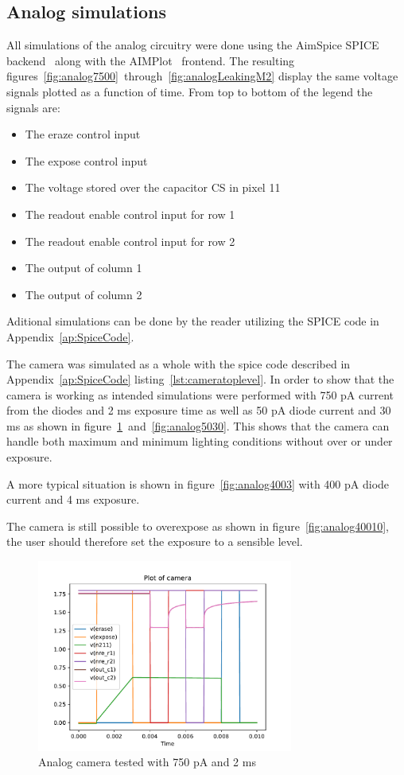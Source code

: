 \subsection{Analog simulations} \label{sec:analogSimulations}

All simulations of the analog circuitry were done using the AimSpice SPICE backend~\cite{AIMSpice} along with the AIMPlot~\cite{aimplot} frontend.
The resulting figures~\ref{fig:analog7500}~through~\ref{fig:analogLeakingM2} display the same voltage signals plotted as a function of time.
From top to bottom of the legend the signals are:
\begin{itemize}
\item The eraze control input
\item The expose control input
\item The voltage stored over the capacitor CS in pixel 11
\item The readout enable control input for row 1
\item The readout enable control input for row 2
\item The output of column 1
\item The output of column 2
\end{itemize}

Aditional simulations can be done by the reader utilizing the SPICE code in Appendix~\ref{ap:SpiceCode}.

The camera was simulated as a whole with the spice code described in Appendix~\ref{ap:SpiceCode} listing~\ref{lst:cameratoplevel}.
In order to show that the camera is working as intended simulations were performed with 750 pA current from the diodes and 2 ms exposure time as well as 50 pA diode current and 30 ms as shown in figure~\ref{fig:analog7502}~and~\ref{fig:analog5030}.
This shows that the camera can handle both maximum and minimum lighting conditions without over or under exposure.

A more typical situation is shown in figure~\ref{fig:analog4003} with 400 pA diode current and 4 ms exposure.

The camera is still possible to overexpose as shown in figure~\ref{fig:analog40010}, the user should therefore set the exposure to a sensible level.

\begin{figure}[H]
  \centering
  \includegraphics[width=0.75\textwidth]{../analog/camera7502}
  \caption{Analog camera tested with 750 pA and 2 ms}
  \label{fig:analog7502}
\end{figure}


